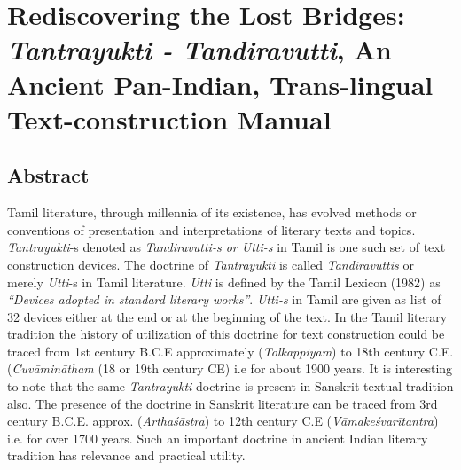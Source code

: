 
\chapter{Rediscovering the Lost Bridges: \textit{Tantrayukti - Tandiravutti}, An Ancient Pan-Indian, Trans-lingual Text-construction Manual}\label{chapter3}



\section*{Abstract}

Tamil literature, through millennia of its existence, has evolved methods or conventions of presentation and interpretations of literary texts and topics. \textit{Tantrayukti}-s denoted as \textit{Tandiravutti-s or Utti-s} in Tamil is one such set of text construction devices. The doctrine of \textit{Tantrayukti} is called \textit{Tandiravuttis} or merely \textit{Utti}-s in Tamil literature. \textit{Utti} is defined by the Tamil Lexicon (1982) as \textit{“Devices adopted in standard literary works”}. \textit{Utti-s} in Tamil are given as list of 32 devices either at the end or at the beginning of the text. In the Tamil literary tradition the history of utilization of this doctrine for text construction could be traced from 1st century B.C.E approximately (\textit{Tolkāppiyam}) to 18th century C.E. (\textit{Cuvāminātham} (18 or 19th century CE) i.e for about 1900 years. It is interesting to note that the same \textit{Tantrayukti} doctrine is present in Sanskrit textual tradition also. The presence of the doctrine in Sanskrit literature can be traced from 3rd century B.C.E. approx. (\textit{Arthaśāstra}) to 12th century C.E (\textit{Vāmakeśvarītantra}) i.e. for over 1700 years. Such an important doctrine in ancient Indian literary tradition has relevance and practical utility.

